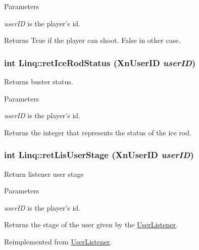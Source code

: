 \begin{DoxyParams}{Parameters}
\item[{\em userID}]is the player's id.\end{DoxyParams}
\begin{DoxyReturn}{Returns}
True if the player can shoot. False in other case. 
\end{DoxyReturn}
\hypertarget{classLinq_a55ee00fafc766eecaac949772197892a}{
\subsubsection[{retIceRodStatus}]{\setlength{\rightskip}{0pt plus 5cm}int Linq::retIceRodStatus (XnUserID {\em userID})}}
\label{classLinq_a55ee00fafc766eecaac949772197892a}
Returns buster status.


\begin{DoxyParams}{Parameters}
\item[{\em userID}]is the player's id.\end{DoxyParams}
\begin{DoxyReturn}{Returns}
the integer that represents the status of the ice rod. 
\end{DoxyReturn}
\hypertarget{classLinq_a6994af326a734f473eae3983b32a5148}{
\subsubsection[{retLisUserStage}]{\setlength{\rightskip}{0pt plus 5cm}int Linq::retLisUserStage (XnUserID {\em userID})}}
\label{classLinq_a6994af326a734f473eae3983b32a5148}
Return listener user stage


\begin{DoxyParams}{Parameters}
\item[{\em userID}]is the player's id.\end{DoxyParams}
\begin{DoxyReturn}{Returns}
the stage of the user given by the \hyperlink{classUserListener}{UserListener}. 
\end{DoxyReturn}


Reimplemented from \hyperlink{classUserListener_ad28b54b309b207f197ed238263d1014e}{UserListener}.



